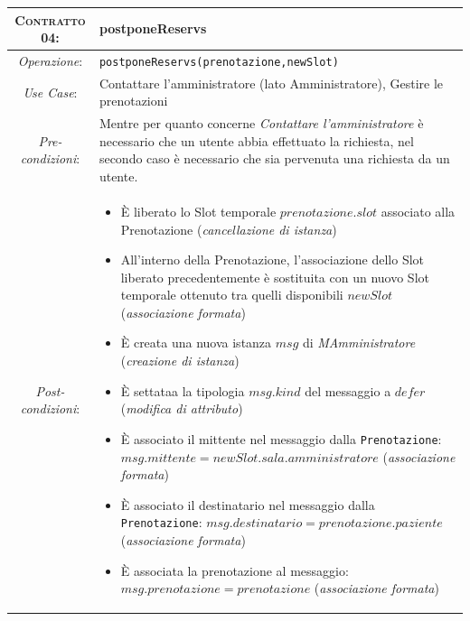 \begin{tabularx}{\columnwidth}{cX}
\toprule
\textsc{Contratto 04}:& \textbf{postponeReservs}\\
\midrule
\textit{Operazione}: & 	\texttt{postponeReservs(prenotazione,newSlot)}\\
\textit{Use Case}: &	Contattare l'amministratore (lato Amministratore), Gestire le prenotazioni\\
\textit{Pre-condizioni}: &  Mentre per quanto concerne \textit{Contattare l'amministratore}
			è necessario che un utente abbia effettuato la richiesta,
			nel secondo caso è necessario che sia pervenuta una
			richiesta da un utente.\\
\textit{Post-condizioni}: & \begin{itemize}
\item È liberato lo Slot temporale $prenotazione.slot$ associato alla Prenotazione (\textit{cancellazione
	di istanza})
\item All'interno della Prenotazione, l'associazione dello Slot liberato 
	precedentemente è sostituita  con un nuovo Slot temporale ottenuto tra 
	quelli disponibili $newSlot$ (\textit{associazione formata})
\item È creata una nuova istanza $msg$ di \textit{MAmministratore} (\textit{creazione di istanza})
\item È settataa la tipologia $msg.kind$ del messaggio a $defer$ (\textit{modifica di attributo})
\item È associato il mittente nel messaggio dalla \texttt{Prenotazione}: $msg.mittente = 
	newSlot.sala.amministratore$ (\textit{associazione formata})
\item È associato il destinatario nel messaggio dalla \texttt{Prenotazione}: $msg.destinatario 
	= prenotazione.paziente$ (\textit{associazione formata})
\item È associata la prenotazione al messaggio: $msg.prenotazione = prenotazione$
	(\textit{associazione formata})
\end{itemize}\\
\bottomrule
\end{tabularx}
\medskip




